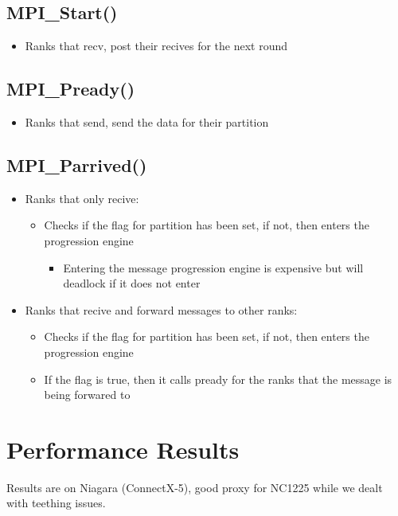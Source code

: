 \documentclass{article}
\begin{document}
  \subsection{MPI\_Start()}
  \begin{itemize}
    \item Ranks that recv, post their recives for the next round
  \end{itemize}

  \subsection{MPI\_Pready()}
  \begin{itemize}
    \item Ranks that send, send the data for their partition
  \end{itemize}

  \subsection{MPI\_Parrived()}
  \begin{itemize}
    \item Ranks that only recive:
    \begin{itemize}
      \item Checks if the flag for partition has been set, if not, then enters
            the progression engine
      \begin{itemize}
        \item Entering the message progression engine is expensive but will
              deadlock if it does not enter
      \end{itemize}
    \end{itemize}
    \item Ranks that recive and forward messages to other ranks:
    \begin{itemize}
      \item Checks if the flag for partition has been set, if not, then enters
            the progression engine
      \item If the flag is true, then it calls pready for the ranks that the
            message is being forwared to
    \end{itemize}
  \end{itemize}

  \section{Performance Results}
  Results are on Niagara (ConnectX-5), good proxy for NC1225 while we dealt with teething issues.
\end{document}
